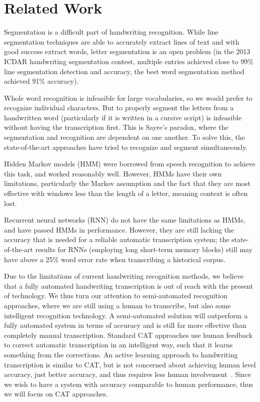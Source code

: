 \documentclass[ms]{byuprop}
\begin{document}
\section{Related Work}

Segmentation is a difficult part of handwriting recognition. While line segmentation techniques are able to accurately extract lines of text and with good success extract words, letter segmentation is an open problem (in the 2013 ICDAR handwriting segmentation contest, multiple entries achieved close to 99\% line segmentation detection and accuracy, the best word segmentation method achieved 91\% accuracy\cite{icdar_segmentation2013}).

Whole word recognition is infeasible for large vocabularies, so we would prefer to recognize individual characters. But to properly segment the letters from a handwritten word (particularly if it is written in a cursive script) is infeasible without having the transcription first. This is Sayre's paradox, where the segmentation and recognition are dependent on one another.\cite{sayres} To solve this, the state-of-the-art approaches have tried to recognize and segment simultaneously.

Hidden Markov models (HMM) were borrowed from speech recognition to achieve this task, and worked reasonably well\cite{Marti2001}. However, HMMs have their own limitations, particularly the Markov assumption and the fact that they are most effective with windows less than the length of a letter, meaning context is often lost.

Recurrent neural networks (RNN) do not have the same limitations as HMMs, and have passed HMMs in performance\cite{Graves2009hmm}. However, they are still lacking the accuracy that is needed for a reliable automatic transcription system; the state-of-the-art results for RNNs (employing long short-term memory blocks) still may have above a 25\% word error rate when transcribing a historical corpus\cite{icdarComp2015}.



Due to the limitations of current handwriting recognition methods, we believe that a fully automated handwriting transcription is out of reach with the present of technology. We thus turn our attention to semi-automated recognition approaches, where we are still using a human to transcribe, but also some intelligent recognition technology. A semi-automated solution will outperform a fully automated system in terms of accuracy and is still far more effective than completely manual transcription. Standard CAT approaches use human feedback to correct automatic transcription in an intelligent way, such that it learns something from the corrections. An active learning approach to handwriting transcription is similar to CAT, but is not concerned about achieving human level accuracy, just better accuracy, and thus requires less human involvement~\cite{Serrano2010}. Since we wish to have a system with accuracy comparable to human performance, thus we will focus on CAT approaches.
\end{document}
